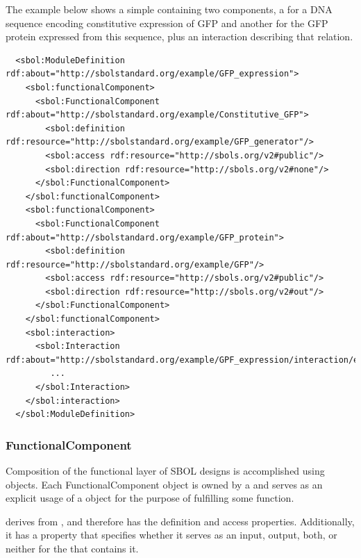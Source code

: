 
The example below shows a simple  containing two components, a  for a DNA sequence encoding constitutive expression of GFP and another for the GFP protein expressed from this sequence, plus an interaction describing that relation.

\begin{lstlisting}
  <sbol:ModuleDefinition rdf:about="http://sbolstandard.org/example/GFP_expression">
    <sbol:functionalComponent>
      <sbol:FunctionalComponent rdf:about="http://sbolstandard.org/example/Constitutive_GFP">
        <sbol:definition rdf:resource="http://sbolstandard.org/example/GFP_generator"/>
        <sbol:access rdf:resource="http://sbols.org/v2#public"/>
        <sbol:direction rdf:resource="http://sbols.org/v2#none"/>
      </sbol:FunctionalComponent>
    </sbol:functionalComponent>
    <sbol:functionalComponent>
      <sbol:FunctionalComponent rdf:about="http://sbolstandard.org/example/GFP_protein">
        <sbol:definition rdf:resource="http://sbolstandard.org/example/GFP"/>
        <sbol:access rdf:resource="http://sbols.org/v2#public"/>
        <sbol:direction rdf:resource="http://sbols.org/v2#out"/>
      </sbol:FunctionalComponent>
    </sbol:functionalComponent>
    <sbol:interaction>
      <sbol:Interaction rdf:about="http://sbolstandard.org/example/GPF_expression/interaction/express_GFP">
         ...
      </sbol:Interaction>
    </sbol:interaction>
  </sbol:ModuleDefinition>
\end{lstlisting}


\subsubsection{FunctionalComponent}
\label{sec:FunctionalComponent}
Composition of the functional layer of SBOL designs is accomplished using  objects. Each FunctionalComponent object is owned by a  and serves as an explicit usage of a  object for the purpose of fulfilling some function. 

 derives from , and therefore has the definition and access properties. Additionally, it has a  property that specifies whether it serves as an input, output, both, or neither for the  that contains it.

